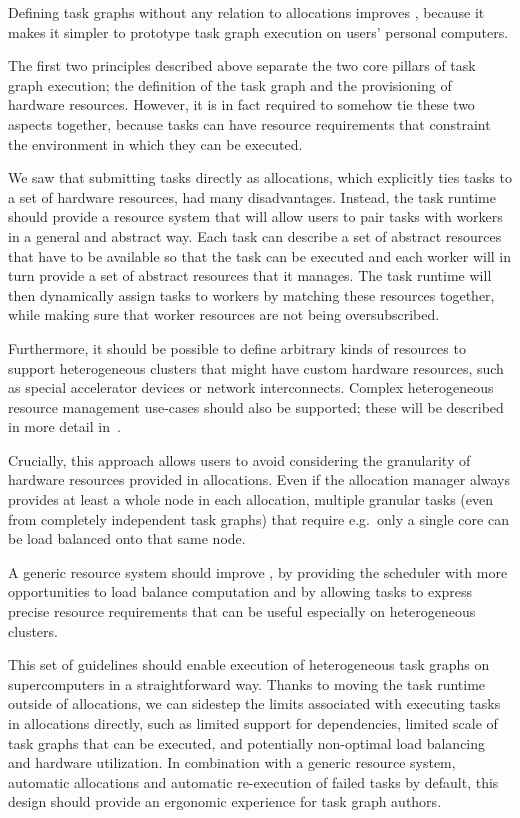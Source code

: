 \begin{description}[wide=0pt]
		Defining task graphs without any relation to allocations improves \ergonomics{}, because
		it makes it simpler to prototype task graph execution on users' personal computers.
	\item[Tasks are paired with workers using abstract resources] The first two principles described above separate the two core pillars of task graph execution; the
		definition of the task graph and the provisioning of hardware resources. However, it is in fact
		required to somehow tie these two aspects together, because tasks can have resource requirements
		that constraint the environment in which they can be executed.

		We saw that submitting tasks directly as allocations, which explicitly ties tasks to a set of
		hardware resources, had many disadvantages. Instead, the task runtime should provide a resource
		system that will allow users to pair tasks with workers in a general and abstract way. Each task
		can describe a set of abstract resources that have to be available so that the task can be executed
		and each worker will in turn provide a set of abstract resources that it manages. The task runtime
		will then dynamically assign tasks to workers by matching these resources together, while making
		sure that worker resources are not being oversubscribed.

		Furthermore, it should be possible to define arbitrary kinds of resources to support heterogeneous
		clusters that might have custom hardware resources, such as special accelerator devices or network
		interconnects. Complex heterogeneous resource management use-cases should also be supported; these
		will be described in more detail in~.

		Crucially, this approach allows users to avoid considering the granularity of hardware resources
		provided in allocations. Even if the allocation manager always provides at least a whole node in
		each allocation, multiple granular tasks (even from completely independent task graphs) that
		require e.g.\ only a single core can be load balanced onto that same node.

		A generic resource system should improve \efficiency, by providing the scheduler with
		more opportunities to load balance computation and by allowing tasks to express precise
		resource requirements that can be useful especially on heterogeneous clusters.
\end{description}

This set of guidelines should enable execution of heterogeneous task graphs on supercomputers in a
straightforward way. Thanks to moving the task runtime outside of allocations, we can sidestep the
limits associated with executing tasks in allocations directly, such as limited support for
dependencies, limited scale of task graphs that can be executed, and potentially non-optimal load
balancing and hardware utilization. In combination with a generic resource system, automatic
allocations and automatic re-execution of failed tasks by default, this design should provide an
ergonomic experience for task graph authors.

